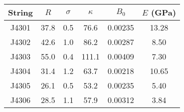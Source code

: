 \begin{tabular}{cccccc}
\toprule
String & $R$ & $\sigma$ & $\kappa$ & $B_0$ & $E$ (GPa) \\
\midrule
J4301 & 37.8 & 0.5 & 76.6 & 0.00235 & 13.28 \\
J4302 & 42.6 & 1.0 & 86.2 & 0.00287 & 8.50 \\
J4303 & 55.0 & 0.4 & 111.1 & 0.00409 & 7.30 \\
J4304 & 31.4 & 1.2 & 63.7 & 0.00218 & 10.65 \\
J4305 & 26.1 & 0.5 & 53.2 & 0.00235 & 5.40 \\
J4306 & 28.5 & 1.1 & 57.9 & 0.00312 & 3.84 \\
\bottomrule
\end{tabular}

